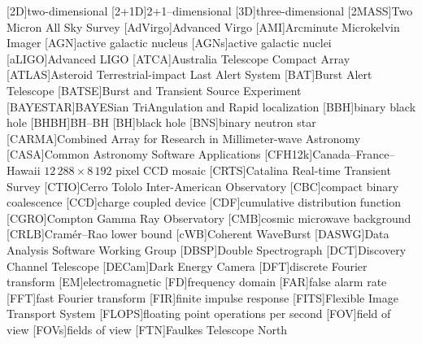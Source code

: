 \providecommand{\acrolowercase}[1]{\lowercase{#1}}

\begin{acronym}
[2D]{two\nobreakdashes-dimensional}
[2+1D]{2+1\nobreakdashes--dimensional}
[3D]{three\nobreakdashes-dimensional}
[2MASS]{Two Micron All Sky Survey}
[AdVirgo]{Advanced Virgo}
[AMI]{Arcminute Microkelvin Imager}
[AGN]{active galactic nucleus}
[AGN\acrolowercase{s}]{active galactic nuclei}
[aLIGO]{Advanced \acs{LIGO}}
[ATCA]{Australia Telescope Compact Array}
[ATLAS]{Asteroid Terrestrial-impact Last Alert System}
[BAT]{Burst Alert Telescope}
[BATSE]{Burst and Transient Source Experiment}
[BAYESTAR]{BAYESian TriAngulation and Rapid localization}
[BBH]{binary black hole}
[BHBH]{\acl{BH}\nobreakdashes--\acl{BH}}
[BH]{black hole}
[BNS]{binary neutron star}
[CARMA]{Combined Array for Research in Millimeter\nobreakdashes-wave Astronomy}
[CASA]{Common Astronomy Software Applications}
[CFH12k]{Canada--France--Hawaii $12\,288 \times 8\,192$ pixel CCD mosaic}
[CRTS]{Catalina Real-time Transient Survey}
[CTIO]{Cerro Tololo Inter-American Observatory}
[CBC]{compact binary coalescence}
[CCD]{charge coupled device}
[CDF]{cumulative distribution function}
[CGRO]{Compton Gamma Ray Observatory}
[CMB]{cosmic microwave background}
[CRLB]{Cram\'{e}r\nobreakdashes--Rao lower bound}
[\acrolowercase{c}WB]{Coherent WaveBurst}
[DASWG]{Data Analysis Software Working Group}
[DBSP]{Double Spectrograph}
[DCT]{Discovery Channel Telescope}
[DECam]{Dark Energy Camera}
[DFT]{discrete Fourier transform}
[EM]{electromagnetic}
[FD]{frequency domain}
[FAR]{false alarm rate}
[FFT]{fast Fourier transform}
[FIR]{finite impulse response}
[FITS]{Flexible Image Transport System}
[FLOPS]{floating point operations per second}
[FOV]{field of view}
[FOV\acrolowercase{s}]{fields of view}
[FTN]{Faulkes Telescope North}

\end{acronym}

